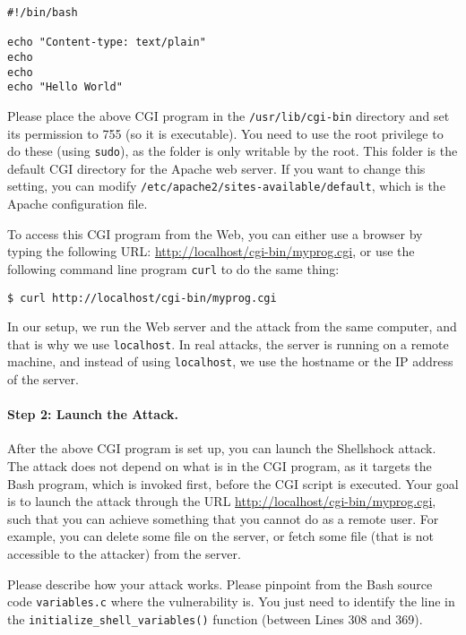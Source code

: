 \begin{Verbatim}[frame=single]
#!/bin/bash

echo "Content-type: text/plain"
echo
echo
echo "Hello World"
\end{Verbatim}

Please place the above CGI program in the {\tt /usr/lib/cgi-bin} directory
and set its permission to 755 (so it is executable). You need to use the
root privilege to do these (using {\tt sudo}), 
as the folder is only writable by the root.
This folder is the default CGI directory for the Apache web server. If you want to 
change this setting, you can modify {\tt /etc/apache2/sites-available/default}, 
which is the Apache configuration file. 

To access this CGI program from the Web, you can either use a browser by
typing the following URL: \url{http://localhost/cgi-bin/myprog.cgi}, or 
use the following command line program {\tt curl} to do the same thing:

\begin{Verbatim}[frame=single]
$ curl http://localhost/cgi-bin/myprog.cgi
\end{Verbatim}

In our setup, we run the Web server and the attack from the same computer,
and that is why we use {\tt localhost}. In real attacks, the server is running on a remote
machine, and instead of using {\tt localhost}, we use the hostname or the
IP address of the server. 



\paragraph{Step 2: Launch the Attack.}
After the above CGI program is set up, you can launch the Shellshock attack. 
The attack does not depend on what is in the CGI program, as it targets
the Bash program, which is invoked first, before the CGI script is
executed. Your goal is to launch the attack through the URL
\url{http://localhost/cgi-bin/myprog.cgi}, such that you can achieve
something that you cannot do as a remote user. For example, you can delete 
some file on the server, or fetch some file (that is not accessible to 
the attacker) from the server. 

Please describe how your attack works. Please pinpoint from the Bash source
code {\tt variables.c} where the vulnerability is. You just need to
identify the line in the {\tt initialize\_shell\_variables()} function
(between Lines 308 and 369). 




